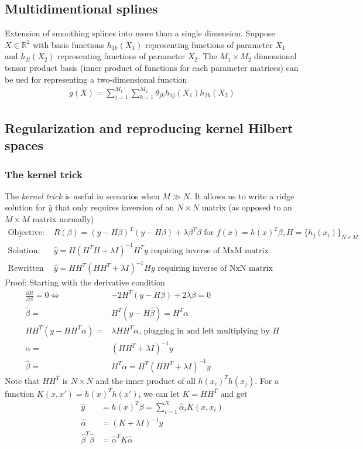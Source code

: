 \documentclass{article}
\begin{document}
\subsection{Multidimentional splines}
Extension of smoothing splines into more than a single dimension. Suppose $X \in \mathbb{R}^2$ with basis functions $h_{1k}(X_1)$ representing functions of parameter $X_1$ and $h_{2l}(X_2)$ representing functions of parameter $X_2$. The $M_1 \times M_2$ dimensional tensor product basis (inner product of functions for each parameter matrices) can be ued for representing a two-dimensional function
\begin{align*}
  g(X) = \sum_{j=1}^{M_1}\sum_{k=1}^{M_2}\theta_{jk}h_{1j}(X_1)h_{2k}(X_2)
\end{align*}


\subsection{Regularization and reproducing kernel Hilbert spaces}
\subsubsection{The kernel trick}
The \textit{kernel trick} is useful in scenarios when $M \gg N$. It allows us to write a ridge solution for $\hat{y}$ that only requires inversion of an $N \times N$ matrix (as opposed to an $M \times M$ matrix normally)
\begin{align*}
  \textrm{Objective: }& R(\beta) = (y - H\beta)^T(y - H\beta) + \lambda \beta^T \beta \textrm{ for } f(x) = h(x)^T\beta, H = \{h_j(x_i)\}_{N\times M}\\
  \textrm{Solution: }& \hat{y} = H(H^TH + \lambda I)^{-1}H^Ty \textrm{ requiring inverse of MxM matrix}\\
  \textrm{Rewritten solution: }& \hat{y} = HH^T(HH^T + \lambda I)^{-1}Hy \textrm{ requiring inverse of NxN matrix}
\end{align*}
Proof: Starting with the derivative condition
\begin{align*}
  \frac{\partial R}{\partial \beta} = 0 \Longleftrightarrow& -2H^T(y - H\beta) + 2\lambda \beta = 0\\
  \hat{\beta} =& H^T(y - H\hat{\beta}) = H^T\alpha\\
  HH^T(y - HH^T\alpha) =& \lambda HH^T\alpha \textrm{, plugging in and left multiplying by } H\\
  \alpha =& (HH^T + \lambda I)^{-1}y\\
  \hat{\beta} =& H^T\alpha = H^T(HH^T + \lambda I)^{-1}y
\end{align*}
Note that $HH^T$ is $N\times N$ and the inner product of all $h(x_i)^Th(x_j)$. For a function $K(x, x') = h(x)^Th(x')$, we can let $K=HH^T$ and get 
\begin{align*}
  \hat{y} &= h(x)^T\beta = \sum_{i=1}^N\hat{\alpha}_iK(x, x_i)\\
  \hat{\alpha} &= (K + \lambda I)^{-1}y\\
  \hat{\beta}^T\hat{\beta} &= \hat{\alpha}^TK\hat{\alpha}
\end{align*}
\end{document}

